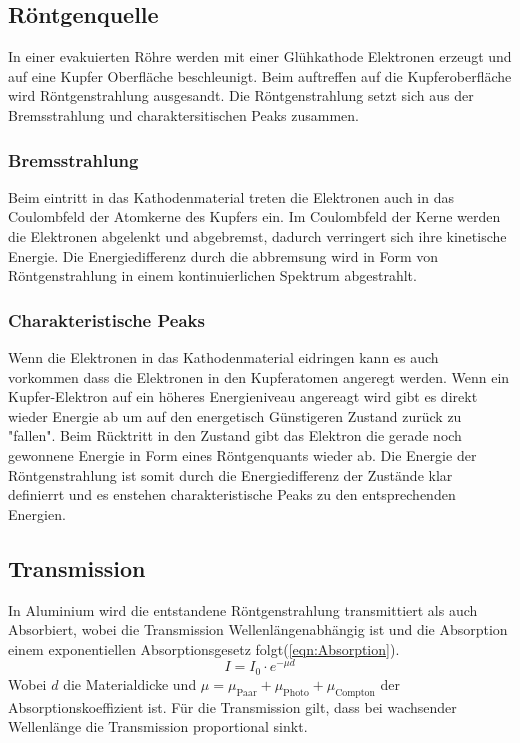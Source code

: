 \subsection{Röntgenquelle}
In einer evakuierten Röhre werden mit einer Glühkathode Elektronen erzeugt und auf eine Kupfer Oberfläche beschleunigt.
Beim auftreffen auf die Kupferoberfläche wird Röntgenstrahlung ausgesandt. Die Röntgenstrahlung setzt sich aus der Bremsstrahlung und charaktersitischen Peaks zusammen.

\subsubsection{Bremsstrahlung}
Beim eintritt in das Kathodenmaterial treten die Elektronen auch in das Coulombfeld der Atomkerne des Kupfers ein.
Im Coulombfeld der Kerne werden die Elektronen abgelenkt und abgebremst, dadurch verringert sich ihre kinetische Energie.
Die Energiedifferenz durch die abbremsung wird in Form von Röntgenstrahlung in einem kontinuierlichen Spektrum abgestrahlt.

\subsubsection{Charakteristische Peaks}
Wenn die Elektronen in das Kathodenmaterial eidringen kann es auch vorkommen dass die Elektronen in den Kupferatomen angeregt werden.
Wenn ein Kupfer-Elektron auf ein höheres Energieniveau angereagt wird gibt es direkt wieder Energie ab um auf den energetisch Günstigeren Zustand zurück zu "fallen".
Beim Rücktritt in den Zustand gibt das Elektron die gerade noch gewonnene Energie in Form eines Röntgenquants wieder ab.
Die Energie der Röntgenstrahlung ist somit durch die Energiedifferenz der Zustände klar definierrt und es enstehen charakteristische Peaks zu den entsprechenden Energien.

\subsection{Transmission}
In Aluminium wird die entstandene Röntgenstrahlung transmittiert als auch Absorbiert, wobei die Transmission Wellenlängenabhängig ist und die Absorption einem exponentiellen Absorptionsgesetz folgt(\ref{eqn:Absorption}).
\begin{equation}
    I = I_0 \cdot e^{-\mu d} \label{eqn:Absorption}
\end{equation}
Wobei $d$ die Materialdicke und $\mu = \mu_{\text{Paar}}+\mu_{\text{Photo}}+\mu_{\text{Compton}}$ der Absorptionskoeffizient ist.
Für die Transmission gilt, dass bei wachsender Wellenlänge die Transmission proportional sinkt.

